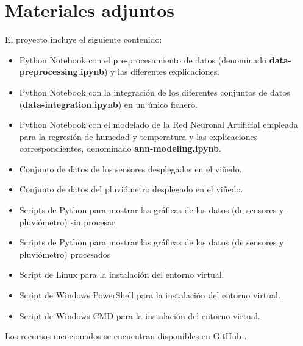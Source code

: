 \section{Materiales adjuntos}
El proyecto incluye el siguiente contenido:
\begin{itemize}
    \item Python Notebook con el pre-procesamiento de datos (denominado \textbf{data-preprocessing.ipynb}) y 
        las diferentes explicaciones.
    \item Python Notebook con la integración de los diferentes conjuntos de datos (\textbf{data-integration.ipynb})
    en un único fichero.
    \item Python Notebook con el modelado de la Red Neuronal Artificial empleada para la regresión
        de humedad y temperatura y las explicaciones correspondientes, denominado \textbf{ann-modeling.ipynb}.
    \item Conjunto de datos de los sensores desplegados en el viñedo.
    \item Conjunto de datos del pluviómetro desplegado en el viñedo.
    \item Scripts de Python para mostrar las gráficas de los datos (de sensores y pluviómetro) sin procesar.
    \item Scripts de Python para mostrar las gráficas de los datos (de sensores y pluviómetro) procesados
    \item Script de Linux para la instalación del entorno virtual.
    \item Script de Windows PowerShell para la instalación del entorno virtual.
    \item Script de Windows CMD para la instalación del entorno virtual.
\end{itemize}
Los recursos mencionados se encuentran disponibles en GitHub \cite{gabriel:2023}.
